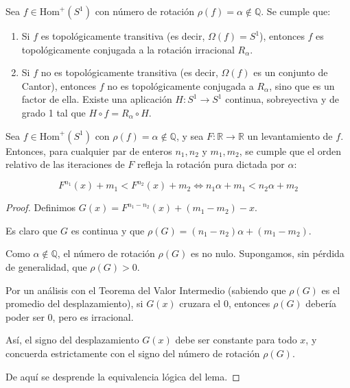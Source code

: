 \begin{teorema}
	
	Sea $f \in \text{Hom}^+(S^1)$ con número de rotación $\rho(f) = \alpha \notin \mathbb{Q}$. Se cumple que:
	
	\begin{enumerate}[1)]
		
		\item Si $f$ es topológicamente transitiva (es decir, $\Omega(f) = S^1$), entonces $f$ es topológicamente conjugada a la rotación irracional $R_\alpha$.
		
		\item Si $f$ no es topológicamente transitiva (es decir, $\Omega(f)$ es un conjunto de Cantor), entonces $f$ no es topológicamente conjugada a $R_\alpha$, sino que es un factor de ella. Existe una aplicación $H: S^1 \to S^1$ continua, sobreyectiva y de grado 1 tal que $H \circ f = R_\alpha \circ H$.
		
	\end{enumerate}
	
\end{teorema}



\begin{lema}
	
	Sea $f \in \text{Hom}^+(S^1)$ con $\rho(f) = \alpha \notin \mathbb{Q}$, y sea $F: \mathbb{R} \to \mathbb{R}$ un levantamiento de $f$. Entonces, para cualquier par de enteros $n_1, n_2$ y $m_1, m_2$, se cumple que el orden relativo de las iteraciones de $F$ refleja la rotación pura dictada por $\alpha$:
	
	$$ F^{n_1}(x) + m_1 < F^{n_2}(x) + m_2 \iff n_1\alpha + m_1 < n_2\alpha + m_2 $$
	
\end{lema}

\begin{proof}
	
	Definimos $G(x) = F^{n_1-n_2}(x) + (m_1-m_2) - x$. 
	
	Es claro que $G$ es continua y que $\rho(G) = (n_1-n_2)\alpha + (m_1-m_2)$.
	
	Como $\alpha \notin \mathbb{Q}$, el número de rotación $\rho(G)$ es no nulo. Supongamos, sin pérdida de generalidad, que $\rho(G) > 0$.
	
	Por un análisis con el Teorema del Valor Intermedio (sabiendo que $\rho(G)$ es el promedio del desplazamiento), si $G(x)$ cruzara el $0$, entonces $\rho(G)$ debería poder ser $0$, pero es irracional. 
	
	Así, el signo del desplazamiento $G(x)$ debe ser constante para todo $x$, y concuerda estrictamente con el signo del número de rotación $\rho(G)$.
	
	De aquí se desprende la equivalencia lógica del lema.
	
\end{proof}



